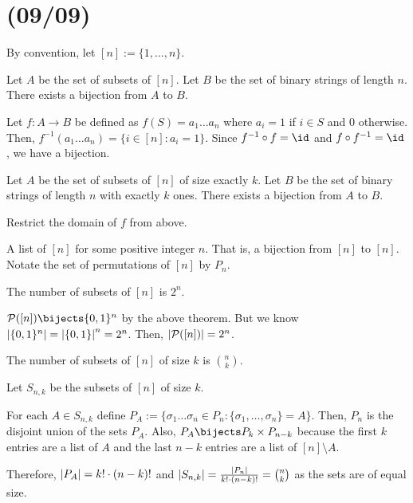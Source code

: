 \documentclass[class=math239,notes]{agony}
\begin{document}
\section{(09/09)}

By convention, let $[n] := \{1,\dotsc,n\}$.

\begin{theorem}
  Let $A$ be the set of subsets of $[n]$.
  Let $B$ be the set of binary strings of length $n$.
  There exists a bijection from $A$ to $B$.
\end{theorem}
\begin{prf}
  Let $f : A \to B$ be defined as $f(S) = a_1\dots a_n$
  where $a_i = 1$ if $i \in S$ and $0$ otherwise.
  Then, $f^{-1}(a_1\dots a_n) = \{i \in [n] : a_i = 1\}$.
  Since $f^{-1} \circ f = \id$ and $f \circ f^{-1} = \id$, we have a bijection.
\end{prf}

\begin{theorem}
  Let $A$ be the set of subsets of $[n]$ of size exactly $k$.
  Let $B$ be the set of binary strings of length $n$ with exactly $k$ ones.
  There exists a bijection from $A$ to $B$.
\end{theorem}
\begin{prf}
  Restrict the domain of $f$ from above.
\end{prf}

\begin{defn}[permutation]
  A list of $[n]$ for some positive integer $n$.
  That is, a bijection from $[n]$ to $[n]$.
  Notate the set of permutations of $[n]$ by $P_n$.
\end{defn}

\begin{theorem}[1.3]
  The number of subsets of $[n]$ is $2^n$.
\end{theorem}
\begin{prf}
  $\mathcal{P}([n]) \bijects \{0,1\}^n$ by the above theorem.
  But we know $\abs{\{0,1\}^n} = \abs{\{0,1\}}^n = 2^n$.
  Then, $\abs{\mathcal{P}([n])} = 2^n$.
\end{prf}

\begin{theorem}[1.5]
  The number of subsets of $[n]$ of size $k$ is $\binom{n}{k}$.
\end{theorem}
\begin{prf}
  Let $S_{n,k}$ be the subsets of $[n]$ of size $k$.

  For each $A \in S_{n,k}$ define $P_A := \{\sigma_1\dots\sigma_n \in P_n : \{\sigma_1,\dotsc,\sigma_n\} = A\}$.
  Then, $P_n$ is the disjoint union of the sets $P_A$.
  Also, $P_A \bijects P_k \times P_{n-k}$ because the first $k$ entries are a list of $A$
  and the last $n-k$ entries are a list of $[n] \setminus A$.

  Therefore, $\abs{P_A} = k! \cdot (n-k)!$ and
  $\abs{S_{n,k}} = \frac{\abs{P_n}}{k!\cdot(n-k)!} = \binom{n}{k}$
  as the sets are of equal size.
\end{prf}
\end{document}
